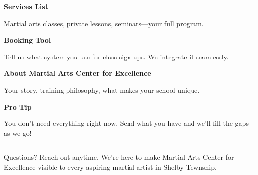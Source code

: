 \documentclass[11pt,letterpaper]{article}
\begin{document}
\begin{minipage}[t]{0.48\textwidth}
\begin{tcolorbox}[colframe=accent-teal, boxrule=1pt, left=0.7em, right=0.7em, top=0.5em, bottom=0.5em, arc=4pt, boxsep=0pt]
{\bfseries\small\color{accent-teal}Services List}

\vspace{0.15em}

{\small Martial arts classes, private lessons, seminars—your full program.}
\end{tcolorbox}

\vspace{0.1em}

\begin{tcolorbox}[colframe=accent-teal, boxrule=1pt, left=0.7em, right=0.7em, top=0.5em, bottom=0.5em, arc=4pt, boxsep=0pt]
{\bfseries\small\color{accent-teal}Booking Tool}

\vspace{0.15em}

{\small Tell us what system you use for class sign‑ups. We integrate it seamlessly.}
\end{tcolorbox}

\vspace{0.1em}

\begin{tcolorbox}[colframe=accent-teal, boxrule=1pt, left=0.7em, right=0.7em, top=0.5em, bottom=0.5em, arc=4pt, boxsep=0pt]
{\bfseries\small\color{accent-teal}About Martial Arts Center for Excellence}

\vspace{0.15em}

{\small Your story, training philosophy, what makes your school unique.}
\end{tcolorbox}

\vspace{-0.2em}
\end{minipage}

\vspace{0.15em}

\begin{tcolorbox}[colback={accent-red!5}, colframe=accent-red!20, boxrule=0.5pt, left=0.7em, right=0.7em, top=0.4em, bottom=0.4em, arc=6pt, boxsep=0pt]

{\bfseries\small\color{accent-red}Pro Tip}

\vspace{0.1em}

{\small You don't need everything right now. Send what you have and we'll fill the gaps as we go!}

\end{tcolorbox}

\vspace{0.15em}

\noindent\hrule
\vspace{0.2em}

{\small\color{text-light}Questions? Reach out anytime. We're here to make Martial Arts Center for Excellence visible to every aspiring martial artist in Shelby Township.}
\end{document}
